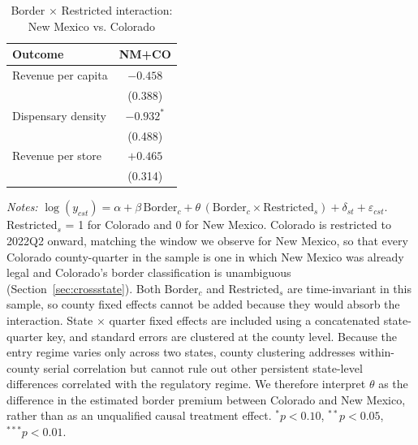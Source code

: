\begin{table}[htbp]
\centering
\caption{Border $\times$ Restricted interaction: New Mexico vs. Colorado}
\label{tab:regime_interaction}
\footnotesize
\begin{tabular}{lc}
\toprule
Outcome & NM+CO \\
\midrule
Revenue per capita & $-0.458$ \\
 & (0.388) \\
Dispensary density & $-0.932^{*}$ \\
 & (0.488) \\
Revenue per store & $+0.465$ \\
 & (0.314) \\
\bottomrule
\end{tabular}
\begin{minipage}{0.98\textwidth}
\vspace{0.5em}

\fontsize{9pt}{11pt}\selectfont
\textit{Notes:} $\log(y_{cst}) = \alpha + \beta\,\text{Border}_c
+ \theta\,(\text{Border}_c \times \text{Restricted}_s)
+ \delta_{st} + \varepsilon_{cst}$.
Restricted$_s$ = 1 for Colorado and 0 for New Mexico. Colorado is restricted to
2022Q2 onward, matching the window we observe for New Mexico, so that every
Colorado county-quarter in the sample is one in which New Mexico was already
legal and Colorado's border classification is unambiguous
(Section~\ref{sec:crossstate}). Both Border$_c$ and Restricted$_s$ are
time-invariant in this sample, so county fixed effects cannot be added because
they would absorb the interaction. State $\times$ quarter fixed effects are
included using a concatenated state-quarter key, and standard errors are
clustered at the county level. Because the entry regime varies only across two
states, county clustering addresses within-county serial correlation but cannot
rule out other persistent state-level differences correlated with the regulatory
regime. We therefore interpret $\theta$ as the difference in the estimated
border premium between Colorado and New Mexico, rather than as an unqualified
causal treatment effect. $^{*}p<0.10$, $^{**}p<0.05$, $^{***}p<0.01$.
\end{minipage}
\end{table}
